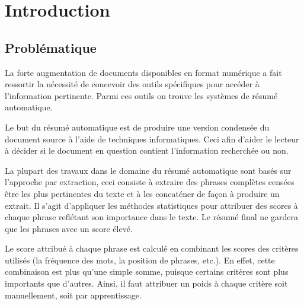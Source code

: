 \documentclass[a4paper,12pt,oneside]{../use/ESIthesis}
\begin{document}
  	 	
  	 	\mainmatter
  \fi

\chapter*{Introduction}

\section*{Problématique}

La forte augmentation de documents disponibles en format numérique a fait ressortir la nécessité de concevoir des outils spécifiques pour accéder à l'information pertinente. 
Parmi ces outils on trouve les systèmes de résumé automatique.

Le but du résumé automatique est de produire une version condensée du document source à l'aide de techniques informatiques. 
Ceci afin d'aider le lecteur à décider si le document en question contient l'information recherchée ou non. 

La plupart des travaux dans le domaine du résumé automatique sont basés sur l'approche par extraction, ceci consiste à extraire des phrases complètes censées être les plus pertinentes du texte et à les concaténer de façon à produire un extrait. 
Il s'agit d'appliquer les méthodes statistiques pour attribuer des scores à chaque phrase reflétant son importance dans le texte. 
Le résumé final ne gardera que les phrases avec un score élevé.

Le score attribué à chaque phrase est calculé en combinant les scores des critères utilisés (la fréquence des mots, la position de phrases, etc.). 
En effet, cette combinaison est plus qu'une simple somme, puisque certains critères sont plus importants que d'autres. 
Ainsi, il faut attribuer un poids à chaque critère soit manuellement, soit par apprentissage. 
\end{document}
